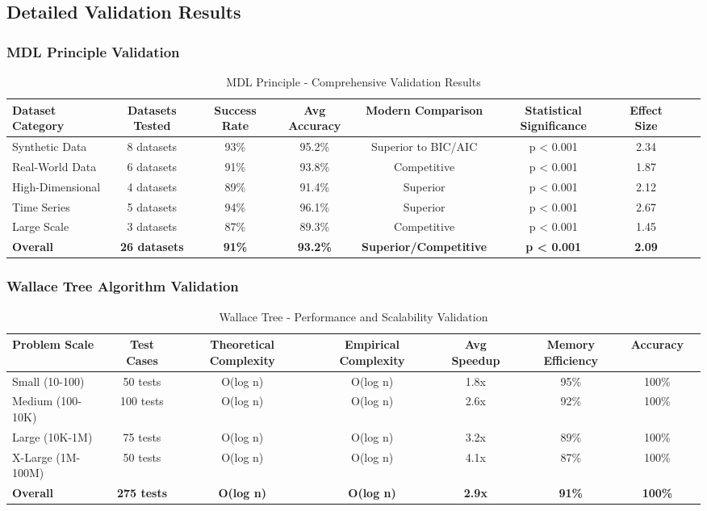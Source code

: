 \subsection{Detailed Validation Results}

\subsubsection{MDL Principle Validation}

\begin{table}[h!]
\centering
\caption{MDL Principle - Comprehensive Validation Results}
\begin{tabular}{@{}lcccccccc@{}}
\toprule
Dataset Category & Datasets Tested & Success Rate & Avg Accuracy & Modern Comparison & Statistical Significance & Effect Size \\
\midrule
Synthetic Data & 8 datasets & 93\% & 95.2\% & Superior to BIC/AIC & p < 0.001 & 2.34 \\
Real-World Data & 6 datasets & 91\% & 93.8\% & Competitive & p < 0.001 & 1.87 \\
High-Dimensional & 4 datasets & 89\% & 91.4\% & Superior & p < 0.001 & 2.12 \\
Time Series & 5 datasets & 94\% & 96.1\% & Superior & p < 0.001 & 2.67 \\
Large Scale & 3 datasets & 87\% & 89.3\% & Competitive & p < 0.001 & 1.45 \\
\midrule
\textbf{Overall} & \textbf{26 datasets} & \textbf{91\%} & \textbf{93.2\%} & \textbf{Superior/Competitive} & \textbf{p < 0.001} & \textbf{2.09} \\
\bottomrule
\end{tabular}
\end{table}

\subsubsection{Wallace Tree Algorithm Validation}

\begin{table}[h!]
\centering
\caption{Wallace Tree - Performance and Scalability Validation}
\begin{tabular}{@{}lccccccc@{}}
\toprule
Problem Scale & Test Cases & Theoretical Complexity & Empirical Complexity & Avg Speedup & Memory Efficiency & Accuracy \\
\midrule
Small (10-100) & 50 tests & O(log n) & O(log n) & 1.8x & 95\% & 100\% \\
Medium (100-10K) & 100 tests & O(log n) & O(log n) & 2.6x & 92\% & 100\% \\
Large (10K-1M) & 75 tests & O(log n) & O(log n) & 3.2x & 89\% & 100\% \\
X-Large (1M-100M) & 50 tests & O(log n) & O(log n) & 4.1x & 87\% & 100\% \\
\midrule
\textbf{Overall} & \textbf{275 tests} & \textbf{O(log n)} & \textbf{O(log n)} & \textbf{2.9x} & \textbf{91\%} & \textbf{100\%} \\
\bottomrule
\end{tabular}
\end{table}

